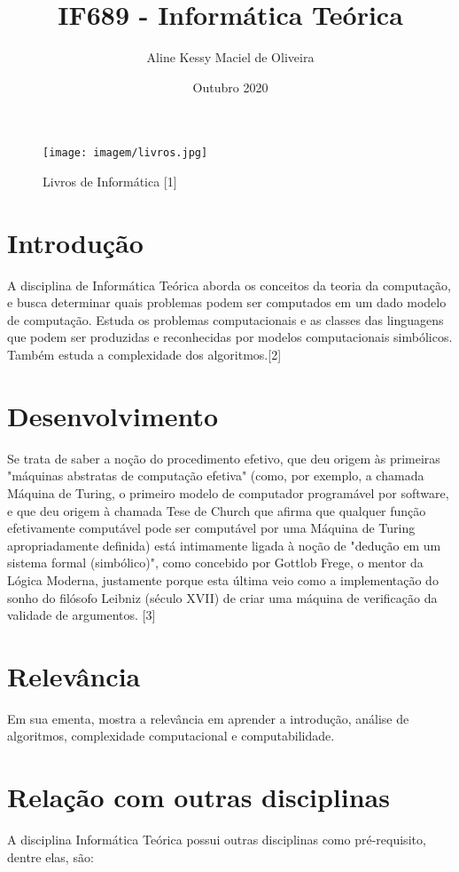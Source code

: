\documentclass{article}
\title{\textbf{IF689 - Informática Teórica}}
\author{Aline Kessy Maciel de Oliveira}
\date{Outubro 2020}
\begin{document}
\maketitle
\begin{figure}[htb]
    \centering
    \texttt{[image: imagem/livros.jpg]}
    \caption{Livros de Informática [1]}
    \label{fig:my_label}
\end{figure}

\section{Introdução}

\par A disciplina de Informática Teórica aborda os conceitos da teoria da computação, e busca determinar quais problemas podem ser computados em um dado modelo de computação. Estuda os problemas computacionais e as classes das linguagens que podem ser produzidas e reconhecidas por modelos computacionais simbólicos. Também estuda a complexidade dos algoritmos.[2]

\section{Desenvolvimento}
\par Se trata de saber a noção do procedimento efetivo, que deu origem às primeiras "máquinas abstratas de computação efetiva" (como, por exemplo, a chamada Máquina de Turing, o primeiro modelo de computador programável por software, e que deu origem à chamada Tese de Church que afirma que qualquer função efetivamente computável pode ser computável por uma Máquina de Turing apropriadamente definida) está intimamente ligada à noção de "dedução em um sistema formal (simbólico)", como concebido por Gottlob Frege, o mentor da Lógica Moderna, justamente porque esta última veio como a implementação do sonho do filósofo Leibniz (século XVII) de criar uma máquina de verificação da validade de argumentos. [3]

\section{Relevância}
\par Em sua ementa, mostra a relevância em aprender a introdução, análise de algoritmos, complexidade computacional e computabilidade.

\section{Relação com outras disciplinas}
A disciplina Informática Teórica possui outras disciplinas como pré-requisito, dentre elas, são:
\end{document}
